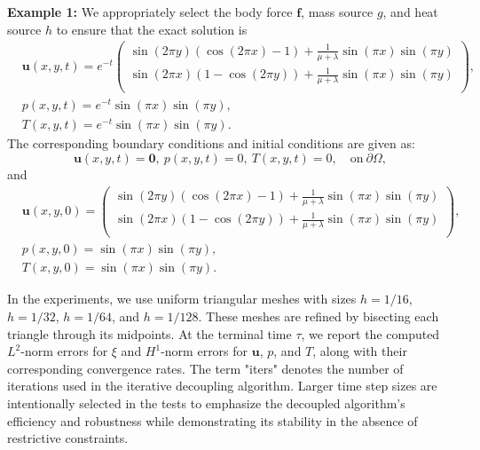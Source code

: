 \documentclass{article}
\numberwithin{equation}{section}
\begin{document}
{\bfseries Example 1:}
We appropriately select the body force \(\bm f\), mass source \(g\), and heat source \(h\) to ensure that the exact solution is
\begin{equation*} 
\begin{aligned}   
      & \bm u(x,y,t)= e^{-t}\left(\begin{array}{c}  
     \sin(2\pi y)(\cos(2\pi x) -1)+\frac{1}{\mu+\lambda}\sin(\pi x) \sin(\pi y)  \\  
     \sin(2\pi x)(1-\cos(2\pi y) )+\frac{1}{\mu+\lambda}\sin(\pi x) \sin(\pi y)   \\
                                 \end{array}\right),   \\
      & p(x,y,t) =   e^{-t}\sin(\pi x) \sin(\pi y) ,      \\
      & T(x,y,t) =   e^{-t}\sin(\pi x) \sin(\pi y) .
\end{aligned}
\end{equation*} 
The corresponding boundary conditions and initial conditions are given as:
\begin{equation*}   
     \bm u(x,y,t)= \bm 0,~p(x,y,t) =   0 ,~T(x,y,t) =   0 ,  \quad \mbox{on}~\partial \Omega,
\end{equation*} 
and
\begin{equation*} 
\begin{aligned}   
      & \bm u(x,y,0)= \left(\begin{array}{c}  
     \sin(2\pi y)(\cos(2\pi x) -1)+\frac{1}{\mu+\lambda}\sin(\pi x) \sin(\pi y)  \\  
     \sin(2\pi x)(1-\cos(2\pi y) )+\frac{1}{\mu+\lambda}\sin(\pi x) \sin(\pi y)   \\
                                 \end{array}\right),   \\
      & p(x,y,0) =   \sin(\pi x) \sin(\pi y)    ,      \\
      & T(x,y,0) =   \sin(\pi x) \sin(\pi y)   .
\end{aligned}
\end{equation*} 

In the experiments, we use uniform triangular meshes with sizes \(h = 1/16\), \(h = 1/32\), \(h = 1/64\), and \(h = 1/128\). These meshes are refined by bisecting each triangle through its midpoints. At the terminal time \(\tau\), we report the computed \(L^2\)-norm errors for \(\xi\) and \(H^1\)-norm errors for \(\bm u\), \(p\), and \(T\), along with their corresponding convergence rates. The term "iters" denotes the number of iterations used in the iterative decoupling algorithm. Larger time step sizes are intentionally selected in the tests to emphasize the decoupled algorithm's efficiency and robustness while demonstrating its stability in the absence of restrictive constraints.
\end{document}
